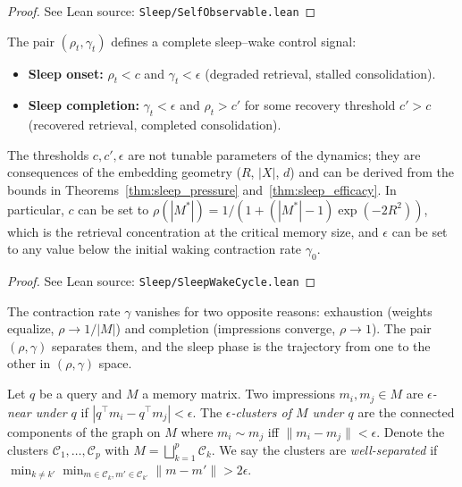 \begin{proof}
\leanok
{}
See Lean source: \texttt{Sleep/SelfObservable.lean}
\end{proof}

\begin{corollary}
\label{cor:sleep_wake_cycle}
\leanok
The pair $(\rho_t, \gamma_t)$ defines a complete sleep--wake control signal:
\begin{itemize}
\item \textbf{Sleep onset:} $\rho_t < c$ and $\gamma_t < \epsilon$ (degraded retrieval, stalled consolidation).
\item \textbf{Sleep completion:} $\gamma_t < \epsilon$ and $\rho_t > c'$ for some recovery threshold $c' > c$ (recovered retrieval, completed consolidation).
\end{itemize}
The thresholds $c, c', \epsilon$ are not tunable parameters of the dynamics; they are consequences of the embedding geometry ($R$, $|X|$, $d$) and can be derived from the bounds in Theorems~\ref{thm:sleep_pressure} and~\ref{thm:sleep_efficacy}.  In particular, $c$ can be set to $\rho(|M^*|) = 1/(1 + (|M^*| - 1)\exp(-2R^2))$, which is the retrieval concentration at the critical memory size, and $\epsilon$ can be set to any value below the initial waking contraction rate $\gamma_0$.
\end{corollary}

\begin{proof}
\leanok
See Lean source: \texttt{Sleep/SleepWakeCycle.lean}
\end{proof}

\begin{remark}
\label{rem:two_gamma_regimes}
\leanok
The contraction rate $\gamma$ vanishes for two opposite reasons: exhaustion (weights equalize, $\rho \to 1/|M|$) and completion (impressions converge, $\rho \to 1$).  The pair $(\rho, \gamma)$ separates them, and the sleep phase is the trajectory from one to the other in $(\rho, \gamma)$ space.
\end{remark}

\begin{definition}
\label{def:cluster}
\leanok
Let $q$ be a query and $M$ a memory matrix.  Two impressions $m_i, m_j \in M$ are \emph{$\epsilon$-near under $q$} if $|q^\top m_i - q^\top m_j| < \epsilon$.  The \emph{$\epsilon$-clusters of $M$ under $q$} are the connected components of the graph on $M$ where $m_i \sim m_j$ iff $\|m_i - m_j\| < \epsilon$.  Denote the clusters $\mathcal{C}_1, \ldots, \mathcal{C}_p$ with $M = \bigsqcup_{k=1}^p \mathcal{C}_k$.  We say the clusters are \emph{well-separated} if $\min_{k \neq k'}\min_{m \in \mathcal{C}_k, m' \in \mathcal{C}_{k'}} \|m - m'\| > 2\epsilon$.
\end{definition}

